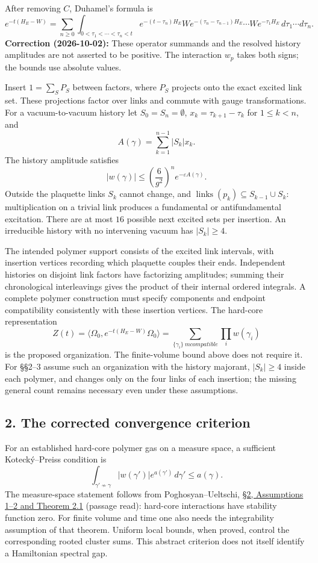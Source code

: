 \documentclass[11pt,a4paper]{article}
\begin{document}
After removing \(C\), Duhamel's formula is
\[e^{-t(H_E-W)}=\sum_{n\ge0}\int_{0<\tau_1<\cdots<\tau_n<t}
e^{-(t-\tau_n)H_E}W e^{-(\tau_n-\tau_{n-1})H_E}\cdots W e^{-\tau_1H_E}\,d\tau_1\cdots d\tau_n.\]
\textbf{Correction (2026-10-02):} These operator summands and the
resolved history amplitudes are not asserted to be positive. The
interaction \(w_p\) takes both signs; the bounds use absolute values.

Insert \(1=\sum_SP_S\) between factors, where \(P_S\) projects onto the
exact excited link set. These projections factor over links and commute
with gauge transformations. For a vacuum-to-vacuum history let
\(S_0=S_n=\emptyset\), \(x_k=\tau_{k+1}-\tau_k\) for \(1\le k<n\), and
\[A(\gamma)=\sum_{k=1}^{n-1}|S_k|x_k.\] The history amplitude satisfies
\[|w(\gamma)|\le\left(\frac6{g^2}\right)^n e^{-\varepsilon A(\gamma)}.\]
Outside the plaquette links \(S_k\) cannot change, and
\(\operatorname{links}(p_k)\subseteq S_{k-1}\cup S_k\): multiplication
on a trivial link produces a fundamental or antifundamental excitation.
There are at most \(16\) possible next excited sets per insertion. An
irreducible history with no intervening vacuum has \(|S_k|\ge4\).

The intended polymer support consists of the excited link intervals,
with insertion vertices recording which plaquette couples their ends.
Independent histories on disjoint link factors have factorizing
amplitudes; summing their chronological interleavings gives the product
of their internal ordered integrals. A complete polymer construction
must specify components and endpoint compatibility consistently with
these insertion vertices. The hard-core representation
\[Z(t)=\langle\Omega_0,e^{-t(H_E-W)}\Omega_0\rangle
=\sum_{\{\gamma_i\}\ {
m compatible}}\prod_iw(\gamma_i)\] is the proposed organization. The
finite-volume bound above does not require it. For §§2--3 assume such an
organization with the history majorant, \(|S_k|\ge4\) inside each
polymer, and changes only on the four links of each insertion; the
missing general count remains necessary even under these assumptions.

\hypertarget{the-corrected-convergence-criterion}{%
\subsection{2. The corrected convergence
criterion}\label{the-corrected-convergence-criterion}}

For an established hard-core polymer gas on a measure space, a
sufficient Kotecký--Preiss condition is
\[\int_{\gamma'\not\sim\gamma}|w(\gamma')|e^{a(\gamma')}\,d\gamma'\le a(\gamma).\]
The measure-space statement follows from Poghosyan--Ueltschi,
\href{https://arxiv.org/pdf/0811.4281}{§2, Assumptions 1--2 and Theorem
2.1} (passage read): hard-core interactions have stability function
zero. For finite volume and time one also needs the integrability
assumption of that theorem. Uniform local bounds, when proved, control
the corresponding rooted cluster sums. This abstract criterion does not
itself identify a Hamiltonian spectral gap.
\end{document}
